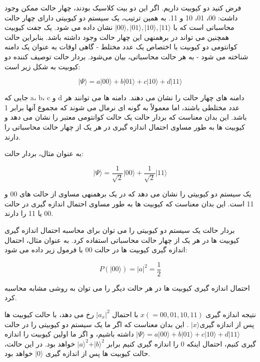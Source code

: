 \documentclass{book}
\begin{document}
فرض کنید دو کیوبیت داریم. اگر این دو بیت کلاسیک بودند، چهار حالت ممکن وجود داشت: 00، 01، 10 و 11. به همین ترتیب، یک سیستم دو کیوبیتی دارای چهار حالت محاسباتی است که با $\vert 00 \rangle, \vert 01 \rangle, \vert 10 \rangle, \vert 11 \rangle$ نشان داده می شود. یک جفت کیوبیت همچنین می تواند در برهمنهی این چهار حالت وجود داشته باشد.
بنابراین حالت کوانتومی دو کیوبیت با اختصاص یک عدد مختلط - گاهی اوقات به عنوان یک دامنه شناخته می شود - به هر حالت محاسباتی، بیان می‌شود. بردار حالت توصیف کننده دو کیوبیت به شکل زیر است:
\begin{center}
	\begin{equation}\label{two qubit system}
		\vert \Psi \rangle = a \vert00\rangle + b \vert01\rangle + c \vert10\rangle + d \vert11\rangle 
	\end{equation}
\end{center}

جایی که a، b، c و d دامنه های چهار حالت را نشان می دهند. دامنه ها می توانند هر عدد مختلطی باشند، اما معمولاً به گونه ای نرمال می شوند که مجموع آنها برابر 1 باشد. این بدان معناست که بردار حالت یک حالت کوانتومی معتبر را نشان می دهد و کیوبیت ها به طور مساوی احتمال اندازه گیری در هر یک از چهار حالت محاسباتی را دارند.

به عنوان مثال، بردار حالت:

\begin{center}
	\begin{equation}
\vert \Psi \rangle = \frac{1}{\sqrt{2}} \vert00\rangle + \frac{1}{\sqrt{2}} \vert11\rangle
	\end{equation}
\end{center}

یک سیستم دو کیوبیتی را نشان می دهد که در یک برهمنهی مساوی از حالت های 00 و 11 است. این بدان معناست که کیوبیت ها به طور مساوی احتمال اندازه گیری در حالت 00 یا 11 را دارند.

بردار حالت یک سیستم دو کیوبیتی را می توان برای محاسبه احتمال اندازه گیری کیوبیت ها در هر یک از چهار حالت محاسباتی استفاده کرد. به عنوان مثال، احتمال اندازه گیری کیوبیت ها در حالت 00 با فرمول زیر داده می شود:
\begin{center}\label{possible value}
\begin{equation}
	P(\vert00\rangle) = \vert a\vert^ 2 = \frac{1}{2}
\end{equation}
\end{center}


احتمال اندازه گیری کیوبیت ها در هر حالت دیگر را می توان به روشی مشابه محاسبه کرد.

نتیجه اندازه گیری $x (= 00, 01, 10 , 11)$ با احتمال $\vert a_{x} \vert ^ 2$ رخ می دهد، با حالت کیوبیت ها پس از اندازه گیری$\vert x \rangle$ . این بدان معناست که اگر ما یک سیستم دو کیوبیتی را در حالت
$\vert \Psi \rangle = a \vert00\rangle + b \vert01\rangle + c \vert10\rangle + d \vert11\rangle $ داشته باشیم، و اگر ما اولین کیوبیت را اندازه گیری کنیم، احتمال اینکه 0 را اندازه گیری کنیم برابر $\vert a \rangle^2 + \vert b \rangle ^ 2$ خواهد بود. در این حالت، حالت کیوبیت ها پس از اندازه گیری $\vert 0 \rangle$ خواهد بود.
\end{document}
